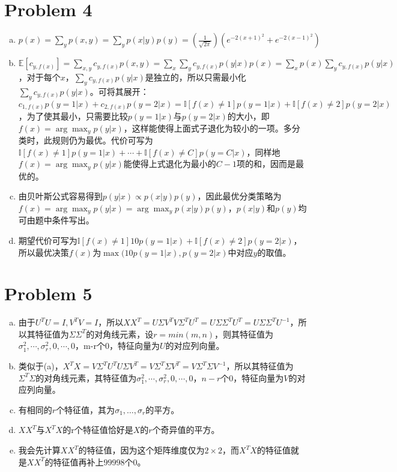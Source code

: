 \documentclass[a4paper,UTF8]{article}
\numberwithin{equation}{section}
\begin{document}
\section*{Problem 4}
\begin{enumerate}[(a)]
	\item $p(x)=\sum_{y}p(x,y)=\sum_{y}p(x|y)p(y)=(\frac{1}{\sqrt{2\pi}})(e^{-2(x+1)^2}+e^{-2(x-1)^2})$
	\item $\mathbb{E}[c_{y,f(x)}]=\sum_{x,y}c_{y,f(x)}p(x,y)=\sum_{x}\sum_{y}c_{y,f(x)}p(y|x)p(x)=\sum_{x}p(x)\sum_{y}c_{y,f(x)}p(y|x)$，对于每个$x$，$\sum_{y}c_{y,f(x)}p(y|x)$是独立的，所以只需最小化$\sum_{y}c_{y,f(x)}p(y|x)$。可将其展开：$c_{1,f(x)}p(y=1|x)+c_{2,f(x)}p(y=2|x)=\mathbb{I}[f(x)\neq1]p(y=1|x)+\mathbb{I}[f(x)\neq2]p(y=2|x)$，为了使其最小，只需要比较$p(y=1|x)$与$p(y=2|x)$的大小，即$f(x)=\arg\max_y p(y|x)$，这样能使得上面式子退化为较小的一项。多分类时，此规则仍为最优。代价可写为$\mathbb{I}[f(x)\neq1]p(y=1|x)+\cdots+\mathbb{I}[f(x)\neq C]p(y=C|x)$，同样地$f(x)=\arg\max_y p(y|x)$能使得上式退化为最小的$C-1$项的和，因而是最优的。
	\item 由贝叶斯公式容易得到$p(y|x)\propto p(x|y)p(y)$，因此最优分类策略为$f(x)=\arg\max_y p(y|x)=\arg\max_y p(x|y)p(y)$，$p(x|y)$和$p(y)$均可由题中条件写出。
	\item 期望代价可写为$\mathbb{I}[f(x)\neq1]10p(y=1|x)+\mathbb{I}[f(x)\neq2]p(y=2|x)$，所以最优决策$f(x)$为$\max(10p(y=1|x), p(y=2|x)$中对应$y$的取值。
\end{enumerate}

\section*{Problem 5}
\begin{enumerate}[(a)]
	\item 由于$U^TU=I,V^TV=I$，所以$XX^T=U\Sigma V^TV\Sigma^TU^T=U\Sigma\Sigma^TU^T=U\Sigma\Sigma^TU^{-1}$，所以其特征值为$\Sigma\Sigma^T$的对角线元素，设$r=min(m,n)$，则其特征值为$\sigma_1^2,\cdots,\sigma_r^2,0,\cdots,0$，m-r个0，特征向量为$U$的对应列向量。
    \item 类似于(a)，$X^TX=V\Sigma^TU^TU\Sigma V^T=V\Sigma^T\Sigma V^T=V\Sigma^T\Sigma V^{-1}$，所以其特征值为$\Sigma^T\Sigma$的对角线元素，其特征值为$\sigma_1^2,\cdots,\sigma_r^2,0,\cdots,0$，$n-r$个$0$，特征向量为$V$的对应列向量。
    \item 有相同的$r$个特征值，其为$\sigma_1,\dots,\sigma_r$的平方。
    \item $XX^T$与$X^TX$的r个特征值恰好是$X$的$r$个奇异值的平方。
    \item 我会先计算$XX^T$的特征值，因为这个矩阵维度仅为$2\times 2$，而$X^TX$的特征值就是$XX^T$的特征值再补上$99998$个$0$。
\end{enumerate}
\end{document}
